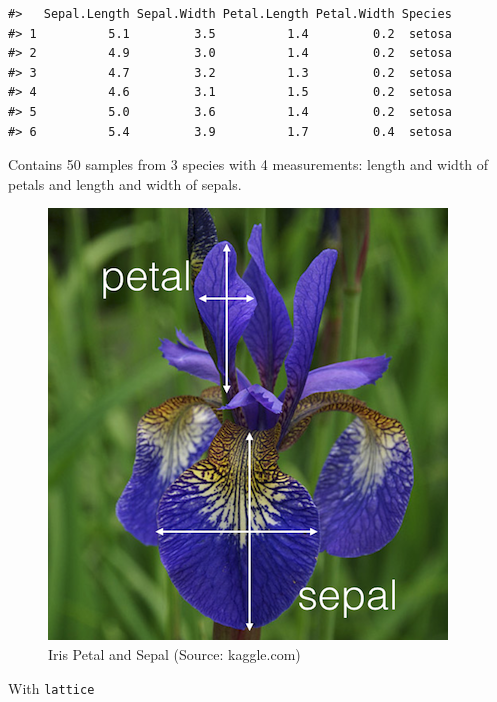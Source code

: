 \documentclass[]{book}
\theoremstyle{definition}
\theoremstyle{definition}
\theoremstyle{definition}
\theoremstyle{remark}
\begin{document}
\begin{verbatim}
#>   Sepal.Length Sepal.Width Petal.Length Petal.Width Species
#> 1          5.1         3.5          1.4         0.2  setosa
#> 2          4.9         3.0          1.4         0.2  setosa
#> 3          4.7         3.2          1.3         0.2  setosa
#> 4          4.6         3.1          1.5         0.2  setosa
#> 5          5.0         3.6          1.4         0.2  setosa
#> 6          5.4         3.9          1.7         0.4  setosa
\end{verbatim}

Contains 50 samples from 3 species with 4 measurements: length and width
of petals and length and width of sepals.

\begin{figure}
\includegraphics[width=0.3\linewidth]{img/iris_petal_sepal} \caption{Iris Petal and Sepal (Source: kaggle.com)}\label{fig:iris-photo}
\end{figure}

With \texttt{lattice}
\end{document}
